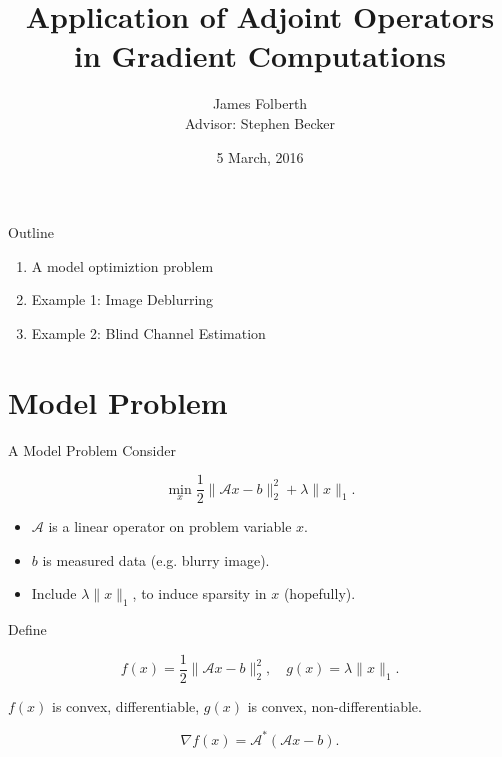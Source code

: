 \documentclass[xcolor=dvipsnames,t]{beamer} %
\title{Application of Adjoint Operators in Gradient Computations}
\date{5 March, 2016}
\author{James Folberth\\Advisor: Stephen Becker}
\institute{University of Colorado at Boulder}
\begin{document}
\begin{frame}
\maketitle
\end{frame}

\begin{frame}{Outline}
   \begin{enumerate}
      \item A model optimiztion problem
      \item Example 1: Image Deblurring
      \item Example 2: Blind Channel Estimation
   \end{enumerate}


\end{frame}

\section{Model Problem}
\begin{frame}{A Model Problem}
   Consider

   \[ \min_x \dfrac{1}{2}\|\mathcal{A}x-b\|_2^2 + \lambda \|x\|_1. \] 

   \begin{itemize}
      \item $\mathcal{A}$ is a linear operator on problem variable $x$.
      \item $b$ is measured data (e.g. blurry image).
      \item Include $\lambda \|x\|_1$, to induce sparsity in $x$ (hopefully).
   \end{itemize}

   Define 

   \[ f(x) = \dfrac{1}{2}\|\mathcal{A}x-b\|_2^2, \quad g(x) = \lambda \|x\|_1. \] 

   \noindent $f(x)$ is convex, differentiable, $g(x)$ is convex, non-differentiable.
   
   \[ \nabla f(x) = \mathcal{A}^\ast\left(\mathcal{A}x-b\right). \] 

\end{frame}
\end{document}
